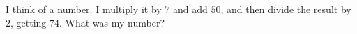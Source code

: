 I think of a number. I multiply it by $7$ and add $50$, and then divide the result by $2$, getting $74$. What was my number?

